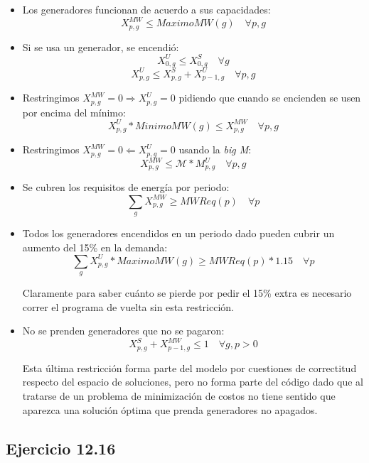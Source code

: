 \begin{itemize}
    \item Los generadores funcionan de acuerdo a sus capacidades:
    $$ X^{MW}_{p,g} \leq MaximoMW(g) \quad \forall p,g $$

    \item Si se usa un generador, se encendió:
    $$ X^U_{0,g} \leq X^S_{0,g} \quad \forall g $$
    $$ X^U_{p,g} \leq X^S_{p,g} + X^U_{p-1,g} \quad \forall p,g $$

    \item Restringimos $X^{MW}_{p,g} = 0 \Rightarrow X^{U}_{p,g} = 0$ pidiendo que cuando se encienden se usen por encima del mínimo:
    $$ X^U_{p,g}*MinimoMW(g) \leq X^{MW}_{p,g} \quad \forall p,g $$

    \item Restringimos $X^{MW}_{p,g} = 0 \Leftarrow X^{U}_{p,g} = 0$ usando la \emph{big M}:
    $$ X^{MW}_{p,g} \leq \mathcal{M}*M^{U}_{p,g} \quad \forall p,g$$

    \item Se cubren los requisitos de energía por periodo:
    $$ \sum_{g} X^{MW}_{p,g} \geq MWReq(p) \quad \forall p $$

    \item Todos los generadores encendidos en un periodo dado pueden cubrir un aumento del 15\% en la demanda:
    $$ \sum_{g} X^{U}_{p,g}*MaximoMW(g) \geq MWReq(p)*1.15 \quad \forall p $$

    Claramente para saber cuánto se pierde por pedir el 15\% extra es necesario correr el programa de vuelta sin esta restricción.

    \item No se prenden generadores que no se pagaron:
    $$ X^S_{p,g} + X^{MW}_{p-1,g} \leq 1 \quad \forall g,p>0 $$

    Esta última restricción forma parte del modelo por cuestiones de correctitud respecto del espacio de soluciones, pero no forma parte del código dado que al tratarse de un problema de minimización de costos no tiene sentido que aparezca una solución óptima que prenda generadores no apagados.

\end{itemize}

\subsection{Ejercicio 12.16}

